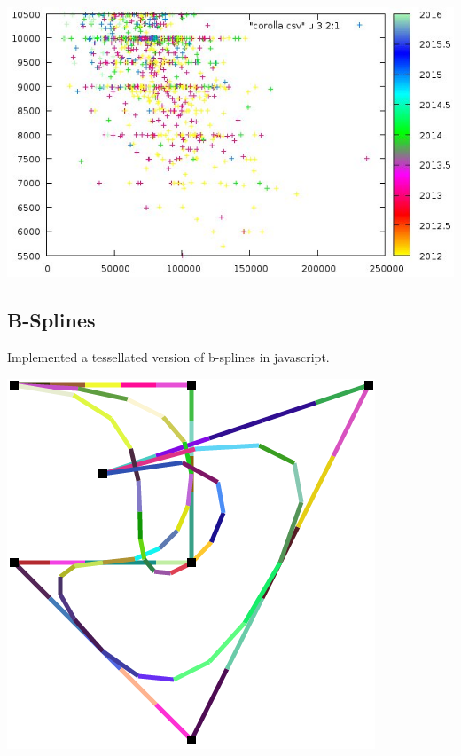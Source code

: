 \documentclass[../resume.tex]{subfiles}
\begin{document}
\href{https://twitter.com/randompast/status/986749286208634881}{\includegraphics[scale=0.5]{../fun/cars.jpeg}}


\subsection{B-Splines}
Implemented a tessellated version of b-splines in javascript.

\href{https://github.com/randompast/b-spline}{\includegraphics[scale=0.5]{../fun/bspline.png} }
\end{document}
